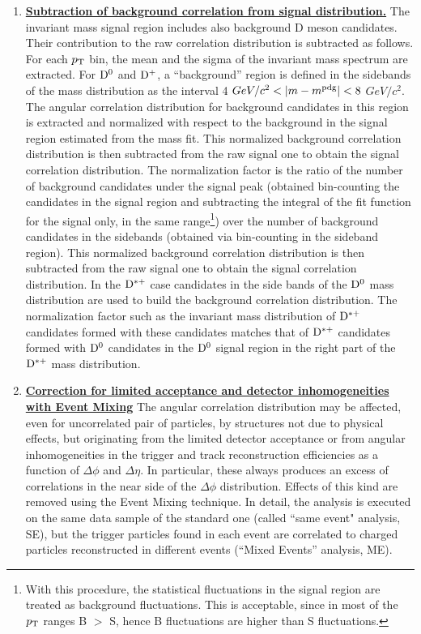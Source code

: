 \begin{enumerate}
\item
\underline {\bf Subtraction of background correlation from signal distribution.}
The invariant mass signal region includes also background D meson candidates. Their contribution to the
raw correlation distribution is subtracted as follows. For each $p_{\rm T}$ bin, the mean and the sigma of the
invariant mass spectrum are extracted. For ${\rm D^0}$ and ${\rm D^+}$, a ``background'' region is defined in the sidebands of the mass
distribution as the interval 4 $GeV/c ^{2}<|m-m^{\rm pdg}|<8$ $GeV/c^{2}$. The angular correlation distribution
for background candidates in this region is extracted and normalized with respect to the background in the signal region
estimated from the mass fit. This normalized background correlation distribution is then subtracted from the
raw signal one to obtain the signal correlation distribution. The normalization factor is the ratio of the number of background candidates under the signal peak (obtained bin-counting the candidates in the signal region and subtracting the integral of the fit function for the signal only, in the same range\footnote{With this procedure, the statistical fluctuations in the signal region are treated as background fluctuations. This is acceptable, since in most of the $p_{\rm T}$ ranges B $>$ S, hence B fluctuations are higher than S fluctuations.}) over the number of background candidates in the sidebands (obtained via bin-counting in the sideband region). This normalized background correlation distribution is then subtracted from the
raw signal one to obtain the signal correlation distribution. In the ${\rm D^{*+}}$ case candidates in the side bands
of the ${\rm D^0}$ mass distribution are used to build the background correlation distribution. The normalization factor such
as the invariant mass distribution of ${\rm D^{*+}}$ candidates formed with these candidates matches that of ${\rm D^{*+}}$ candidates
formed with ${\rm D^0}$ candidates in the ${\rm D^0}$ signal region in the right part of the ${\rm D^{*+}}$ mass distribution.

\item
\underline {\bf Correction for limited acceptance and detector inhomogeneities with Event Mixing}
The angular correlation distribution may be affected, even for uncorrelated pair of particles, by structures not due to physical effects, but originating from the limited detector acceptance or from angular inhomogeneities in the trigger and track reconstruction efficiencies as a function of $\Delta\phi$ and $\Delta\eta$.
In particular, these always produces an excess of correlations in the near side of the $\Delta\phi$ distribution. Effects of this kind are removed using the Event Mixing technique.
In detail, the analysis is executed on the same data sample of the standard one (called ``same event" analysis, SE), but the trigger particles found in each event are correlated to charged particles reconstructed in different events (``Mixed Events'' analysis, ME). \\


\end{enumerate}

